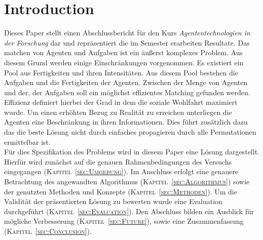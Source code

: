 \documentclass[fleqn,10pt]{SelfArx} %
\newcommand{\ChapterCite}[1]{\textsc{Kapitel~\ref{#1}}}
\begin{document}
\flushbottom %

\maketitle %

\tableofcontents %

\thispagestyle{empty} %


\section*{Introduction} %
\label{sec:introduction}


Dieses Paper stellt einen Abschlussbericht für den Kurs \textit{Agententechnologien in der Forschung} dar und repräsentiert die im Semester erarbeiten Resultate. Das matchen von Agenten und Aufgaben ist ein äußerst komplexes Problem. Aus diesem Grund werden einige Einschränkungen vorgenommen. Es existiert ein Pool aus Fertigkeiten und ihren Intensitäten. Aus diesem Pool bestehen die Aufgaben und die Fertigkeiten der Agenten. Zwischen der Menge von Agenten und der, der Aufgaben soll ein möglichst effizientes Matching gefunden werden. Effizienz definiert hierbei der Grad in dem die soziale Wohlfahrt maximiert wurde. Um einen erhöhten Bezug zu Realität zu erreichen unterliegen die Agenten eine Beschränkung in ihren Informationen. Dies führt zusätzlich dazu das die beste Lösung nicht durch einfaches propagieren durch alle Permutationen ermittelbar ist. \\
Für dies Spezifikation des Problems wird in diesem Paper eine Lösung dargestellt. Hierfür wird zunächst auf die genauen Rahmenbedingungen des Versuchs eingegangen (\ChapterCite{sec:Umgebung}). Im Anschluss erfolgt eine genauere Betrachtung des angewandten Algorithmus (\ChapterCite{sec:Algorithmus}) sowie der genutzten Methoden und Konzepte (\ChapterCite{sec:Methoden}). Um die Validität der präsentierten Lösung zu bewerten wurde eine Evaluation durchgeführt (\ChapterCite{sec:Evaluation}). Den Abschluss bilden ein Ausblick für mögliche Verbesserung (\ChapterCite{sec:Future}), sowie eine Zusammenfassung (\ChapterCite{sec:Conclusion}). 
\end{document}
